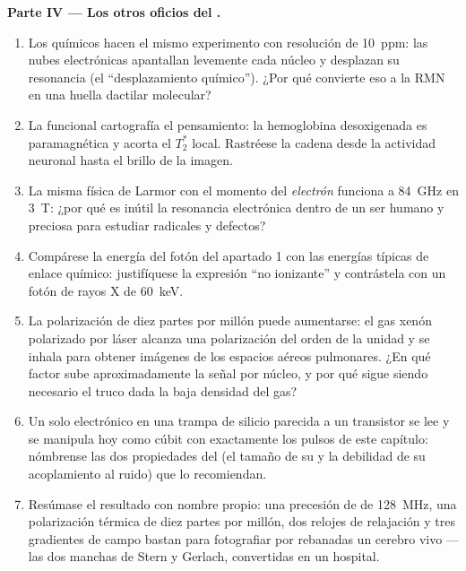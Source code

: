 \begin{problem}
\medskip\noindent\textbf{Parte IV --- Los otros oficios del .}
\begin{enumerate}[resume]
  \item Los químicos hacen el mismo experimento con resolución de
        \qty{10}{ppm}: las nubes electrónicas apantallan levemente cada
        núcleo y desplazan su resonancia (el ``desplazamiento químico'').
        ¿Por qué convierte eso a la RMN en una huella dactilar molecular?
  \item La  funcional cartografía el pensamiento: la
        hemoglobina desoxigenada es paramagnética y acorta el $T_2^*$
        local. Rastréese la cadena desde la actividad neuronal hasta el
        brillo de la imagen.
  \item La misma física de Larmor con el momento del \emph{electrón}
        funciona a \qty{84}{GHz} en \qty{3}{T}: ¿por qué es inútil la
        resonancia electrónica dentro de un ser humano y preciosa para
        estudiar radicales y defectos?
  \item Compárese la energía del fotón del apartado 1 con las energías
        típicas de enlace químico: justifíquese la expresión ``no
        ionizante'' y contrástela con un fotón de rayos X de \qty{60}{keV}.
  \item La polarización de diez partes por millón puede aumentarse: el
        gas xenón polarizado por láser alcanza una polarización del orden
        de la unidad y se inhala para obtener imágenes de los espacios
        aéreos pulmonares. ¿En qué factor sube aproximadamente la señal
        por núcleo, y por qué sigue siendo necesario el truco dada la baja
        densidad del gas?
  \item Un solo  electrónico en una trampa de silicio parecida a un
        transistor se lee y se manipula hoy como cúbit con exactamente los
        pulsos de este capítulo: nómbrense las dos propiedades del  (el
        tamaño de su  y la debilidad de su acoplamiento
        al ruido) que lo recomiendan.
  \item Resúmase el resultado con nombre propio: una precesión de  de
        \qty{128}{MHz}, una polarización térmica de diez partes por
        millón, dos relojes de relajación y tres gradientes de campo
        bastan para fotografiar por rebanadas un cerebro vivo --- las dos
        manchas de Stern y Gerlach, convertidas en un hospital.
\end{enumerate}
\end{problem}
